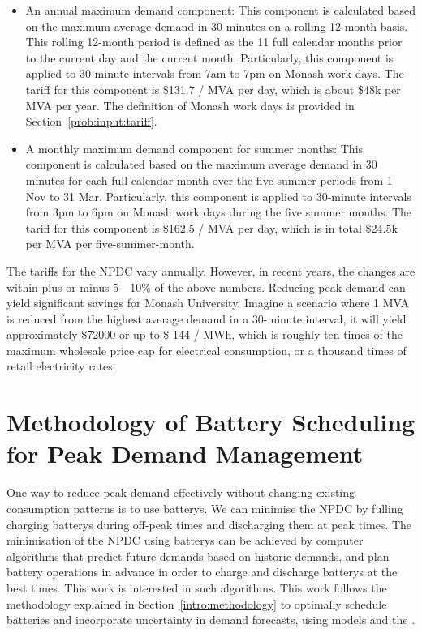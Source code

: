 \begin{itemize}
	\item An annual maximum demand component: This component is calculated based on the maximum average demand in 30 minutes on a rolling 12-month basis. This rolling 12-month period is defined as the 11 full calendar months prior to the current day and the current month. Particularly, this component is applied to 30-minute intervals from 7am to 7pm on Monash work days. The tariff for this component is \$131.7 / MVA per day, which is about \$48k per MVA per year. The definition of Monash work days is provided in Section~\ref{prob:input:tariff}. 
	
	\item A monthly maximum demand component for summer months: This component is calculated based on the maximum average demand in 30 minutes for each full calendar month over the five summer periods from 1 Nov to 31 Mar. Particularly, this component is applied to 30-minute intervals from 3pm to 6pm on Monash work days during the five summer months. The tariff for this component is \$162.5 / MVA per day, which is in total \$24.5k per MVA per five-summer-month. 
\end{itemize} 
The tariffs for the \gls{NPDC} vary annually. However, in recent years, the changes are within plus or minus 5---10\% of the above numbers. 
Reducing peak demand can yield significant savings for Monash University. Imagine a scenario where 1 MVA is reduced from the highest average demand in a 30-minute interval, it will yield approximately \$72000  or up to \$ 144 / MWh, which is roughly ten times of the maximum wholesale price cap for electrical consumption, or a thousand times of retail electricity rates.


\section{Methodology of Battery Scheduling for Peak Demand Management}

One way to reduce peak demand effectively without changing existing consumption patterns is to use \glspl{battery}. 
We can minimise the \gls{NPDC} by fulling charging \glspl{battery} during off-peak times and discharging them at peak times. 
The minimisation of the \gls{NPDC} using \glspl{battery} can be achieved by computer algorithms that predict future demands based on historic demands, and plan battery operations in advance in order to charge and discharge \glspl{battery} at the best times. This work is interested in such algorithms.
This work follows the methodology explained in Section~\ref{intro:methodology} to optimally schedule batteries and incorporate uncertainty in demand forecasts, using \textit{} models and the \textit{}. 

